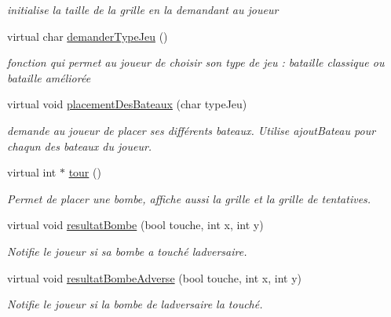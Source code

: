 \begin{DoxyCompactItemize}
\begin{DoxyCompactList}\small\item\em initialise la taille de la grille en la demandant au joueur \end{DoxyCompactList}\item 
virtual char \hyperlink{class_joueur_a72fcb63683baba74922df5de246bff6f}{demander\+Type\+Jeu} ()\hypertarget{class_joueur_a72fcb63683baba74922df5de246bff6f}{}\label{class_joueur_a72fcb63683baba74922df5de246bff6f}

\begin{DoxyCompactList}\small\item\em fonction qui permet au joueur de choisir son type de jeu \+: bataille classique ou bataille améliorée \end{DoxyCompactList}\item 
virtual void \hyperlink{class_joueur_aa97f71a90328693e0047ba2f48d61b4b}{placement\+Des\+Bateaux} (char type\+Jeu)
\begin{DoxyCompactList}\small\item\em demande au joueur de placer ses différents bateaux. Utilise ajout\+Bateau pour chaqun des bateaux du joueur. \end{DoxyCompactList}\item 
virtual int $\ast$ \hyperlink{class_joueur_a46bdd92b73a1f0d04aeb5f19f33720b0}{tour} ()
\begin{DoxyCompactList}\small\item\em Permet de placer une bombe, affiche aussi la grille et la grille de tentatives. \end{DoxyCompactList}\item 
virtual void \hyperlink{class_joueur_a661426005c03ad2ee421249758f5c2a7}{resultat\+Bombe} (bool touche, int x, int y)
\begin{DoxyCompactList}\small\item\em Notifie le joueur si sa bombe a touché l\textquotesingle{}adversaire. \end{DoxyCompactList}\item 
virtual void \hyperlink{class_joueur_aeb9de0a7501a5370d45e670e122b3676}{resultat\+Bombe\+Adverse} (bool touche, int x, int y)
\begin{DoxyCompactList}\small\item\em Notifie le joueur si la bombe de l\textquotesingle{}adversaire l\textquotesingle{}a touché. \end{DoxyCompactList}\end{DoxyCompactItemize}
